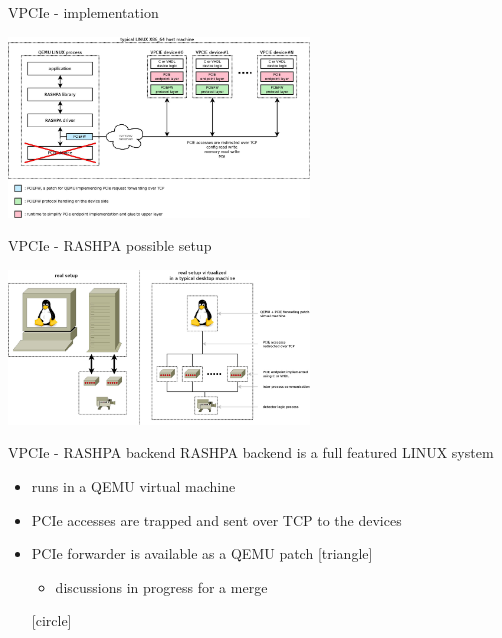 \documentclass{beamer}
\begin{document}
\begin{frame}{VPCIe - implementation}
  \begin{center}
  \includegraphics[width=80mm]{pic/dv_implem/main.jpeg}
  \end{center}
\end{frame}

\begin{frame}{VPCIe - RASHPA possible setup}
  \begin{center}
  \includegraphics[width=80mm]{pic/dv_vpcie/main.jpeg}
  \end{center}
\end{frame}

\begin{frame}{VPCIe - RASHPA backend}
  RASHPA backend is a full featured LINUX system
  \begin{itemize}
  \item runs in a QEMU virtual machine
  \item PCIe accesses are trapped and sent over TCP to the devices
  \item PCIe forwarder is available as a QEMU patch
    [triangle]
    \begin{itemize}
    \item discussions in progress for a merge
    \end{itemize}
    [circle]
  \end{itemize}
\end{frame}
\end{document}
